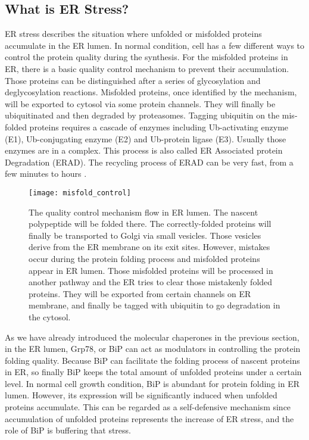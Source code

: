 \subsection{What is ER Stress?}
ER stress describes the situation where unfolded or misfolded proteins accumulate in the ER lumen. In normal condition, cell has a few different ways to control the protein quality during the synthesis. For the misfolded proteins in ER, there is a basic quality control mechanism to prevent their accumulation. Those proteins can be distinguished after a series of glycosylation and deglycosylation reactions. Misfolded proteins, once identified by the mechanism, will be exported to cytosol via some protein channels. They will finally be ubiquitinated and then degraded by proteasomes. Tagging ubiquitin on the mis-folded proteins requires a cascade of enzymes including Ub-activating enzyme (E1), Ub-conjugating enzyme (E2) and Ub-protein ligase (E3). Usually those enzymes are in a complex. This process is also called ER Associated protein Degradation (ERAD). The recycling process of ERAD can be very fast, from a few minutes to hours \citep{schubert2000rapid}.
\begin{figure}[h]
	\centering
	\texttt{[image: misfold\_control]}
	\caption[The general protein quality control process in endoplasmic reticulum.]
	{The quality control mechanism flow in ER lumen. The nascent polypeptide will be folded there. The correctly-folded proteins will finally be transported to Golgi via small vesicles. Those vesicles derive from the ER membrane on its exit sites. However, mistakes occur during the protein folding process and misfolded proteins appear in ER lumen. Those misfolded proteins will be processed in another pathway and the ER tries to clear those mistakenly folded proteins. They will be exported from certain channels on ER membrane, and finally be tagged with ubiquitin to go degradation in the cytosol.}
	\label{fig:misfold_control}
\end{figure}
As we have already introduced the molecular chaperones in the previous section, in the ER lumen, Grp78, or BiP can act as modulators in controlling the protein folding quality. Because BiP can facilitate the folding process of nascent proteins in ER, so finally BiP keeps the total amount of unfolded proteins under a certain level. In normal cell growth condition, BiP is abundant for protein folding in ER lumen. However, its expression will be significantly induced when unfolded proteins accumulate. This can be regarded as a self-defensive mechanism since accumulation of unfolded proteins represents the increase of ER stress, and the role of BiP is buffering that stress. \\

